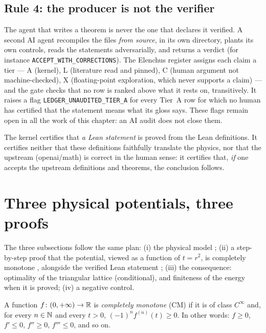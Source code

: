 \subsection{Rule 4: the producer is not the verifier}\label{ch2:ssec:prodverif}
The agent that writes a theorem is never the one that declares it verified. A second AI agent recompiles the files
\emph{from source}, in its own directory, plants its own controls, reads the statements adversarially, and returns a
verdict (for instance \texttt{ACCEPT\_WITH\_CORRECTIONS}). The Elenchus register assigns each claim a tier --- A (kernel),
L (literature read and pinned), C (human argument not machine-checked), X (floating-point exploration, which never
supports a claim) --- and the gate checks that no row is ranked above what it rests on, transitively. It raises a flag
\texttt{LEDGER\_UNAUDITED\_TIER\_A} for every Tier~A row for which no human has certified that the statement means what
its gloss says. These flags remain open in all the work of this chapter: an AI audit does not close them.

\begin{warnbox}
The kernel certifies that \emph{a Lean statement} is proved from the Lean definitions. It certifies neither that these
definitions faithfully translate the physics, nor that the upstream (openai/math) is correct in the human sense: it
certifies that, \emph{if} one accepts the upstream definitions and theorems, the conclusion follows.
\end{warnbox}

\section{Three physical potentials, three proofs}\label{ch2:sec:pot}

The three subsections follow the same plan: (i) the physical model \tierC{}; (ii) a step-by-step proof that the
potential, viewed as a function of $t=r^2$, is completely monotone \tierC{}, alongside the verified Lean statement
\tierA{}; (iii) the consequence: optimality of the triangular lattice (conditional), and finiteness of the energy when it
is proved; (iv) a negative control.

\begin{definition}\label{ch2:def:cm}
A function $f\colon(0,+\infty)\to\mathbb{R}$ is \emph{completely monotone} (CM) if it is of class $C^\infty$ and, for every
$n\in\mathbb{N}$ and every $t>0$, $(-1)^nf^{(n)}(t)\ge0$. In other words: $f\ge0$, $f'\le0$, $f''\ge0$, $f'''\le0$, and so on.
\end{definition}

